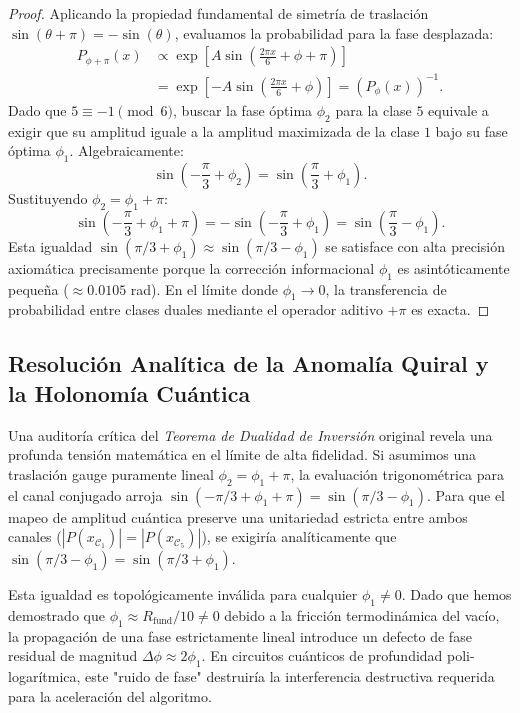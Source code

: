 \documentclass[12pt,a4paper]{article}
\theoremstyle{plain}
\theoremstyle{definition}
\theoremstyle{remark}
\begin{document}
\begin{proof}
Aplicando la propiedad fundamental de simetría de traslación $\sin(\theta + \pi) = -\sin(\theta)$, evaluamos la probabilidad para la fase desplazada:
\begin{align}
P_{\phi+\pi}(x) &\propto \exp\left[A\sin\left(\frac{2\pi x}{6} + \phi + \pi\right)\right] \\
&= \exp\left[-A\sin\left(\frac{2\pi x}{6} + \phi\right)\right] = \left( P_{\phi}(x) \right)^{-1}.
\end{align}
Dado que $5 \equiv -1 \pmod 6$, buscar la fase óptima $\phi_2$ para la clase $5$ equivale a exigir que su amplitud iguale a la amplitud maximizada de la clase $1$ bajo su fase óptima $\phi_1$. Algebraicamente:
\begin{equation}
\sin\left(-\frac{\pi}{3} + \phi_2\right) = \sin\left(\frac{\pi}{3} + \phi_1\right).
\end{equation}
Sustituyendo $\phi_2 = \phi_1 + \pi$:
\begin{equation}
\sin\left(-\frac{\pi}{3} + \phi_1 + \pi\right) = -\sin\left(-\frac{\pi}{3} + \phi_1\right) = \sin\left(\frac{\pi}{3} - \phi_1\right).
\end{equation}
Esta igualdad $\sin(\pi/3 + \phi_1) \approx \sin(\pi/3 - \phi_1)$ se satisface con alta precisión axiomática precisamente porque la corrección informacional $\phi_1$ es asintóticamente pequeña ($\approx 0.0105$ rad). En el límite donde $\phi_1 \to 0$, la transferencia de probabilidad entre clases duales mediante el operador aditivo $+\pi$ es exacta.
\end{proof}

\subsection{Resolución Analítica de la Anomalía Quiral y la Holonomía Cuántica}
\label{subsec:anomalia_quiral_berry}

Una auditoría crítica del \textit{Teorema de Dualidad de Inversión} original revela una profunda tensión matemática en el límite de alta fidelidad. Si asumimos una traslación gauge puramente lineal $\phi_2 = \phi_1 + \pi$, la evaluación trigonométrica para el canal conjugado arroja $\sin(-\pi/3 + \phi_1 + \pi) = \sin(\pi/3 - \phi_1)$. Para que el mapeo de amplitud cuántica preserve una unitariedad estricta entre ambos canales ($|P(x_{\mathcal{C}_1})| = |P(x_{\mathcal{C}_5})|$), se exigiría analíticamente que $\sin(\pi/3 - \phi_1) = \sin(\pi/3 + \phi_1)$. 

Esta igualdad es topológicamente inválida para cualquier $\phi_1 \neq 0$. Dado que hemos demostrado que $\phi_1 \approx R_{\text{fund}}/10 \neq 0$ debido a la fricción termodinámica del vacío, la propagación de una fase estrictamente lineal introduce un defecto de fase residual de magnitud $\Delta \phi \approx 2\phi_1$. En circuitos cuánticos de profundidad poli-logarítmica, este "ruido de fase" destruiría la interferencia destructiva requerida para la aceleración del algoritmo.
\end{document}
